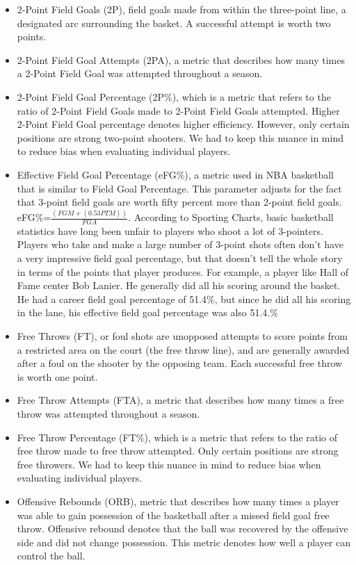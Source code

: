 \documentclass{acm_proc_article-sp}
\begin{document}
\begin{itemize}
\item 2-Point Field Goals (2P), field goals made from within the three-point line, a designated arc surrounding the basket. A successful attempt is worth two points.
\item 2-Point Field Goal Attempts (2PA), a metric that describes how many times a 2-Point Field Goal was attempted throughout a season. 
\item 2-Point Field Goal Percentage (2P\%), which is a metric that refers to the ratio of 2-Point Field Goals made to 2-Point Field Goals attempted. Higher 2-Point Field Goal percentage denotes higher efficiency. However, only certain positions are strong two-point shooters.  We had to keep this nuance in mind to reduce bias when evaluating individual players.
\item Effective Field Goal Percentage (eFG\%), a metric used in NBA basketball that is similar to Field Goal Percentage.  This parameter adjusts for the fact that 3-point field goals are worth fifty percent more than 2-point field goals. eFG\%=$\frac{(FGM+(0.53PTM))}{FGA}$. According to Sporting Charts, basic basketball statistics have long been unfair to players who shoot a lot of 3-pointers. Players who take and make a large number of 3-point shots often don't have a very impressive field goal percentage, but that doesn't tell the whole story in terms of the points that player produces. For example, a player like Hall of Fame center Bob Lanier. He generally did all his scoring around the basket. He had a career field goal percentage of 51.4\%, but since he did all his scoring in the lane, his effective field goal percentage was also 51.4.\%    ~\cite{C}
\item Free Throws (FT), or foul shots are unopposed attempts to score points from a restricted area on the court (the free throw line), and are generally awarded after a foul on the shooter by the opposing team. Each successful free throw is worth one point. 
\item Free Throw Attempts (FTA), a metric that describes how many times a free throw was attempted throughout a season. 
\item Free Throw Percentage (FT\%), which is a metric that refers to the ratio of free throw made to free throw attempted. Only certain positions are strong free throwers.  We had to keep this nuance in mind to reduce bias when evaluating individual players.
\item Offensive Rebounds (ORB), metric that describes how many times a player was able to gain possession of the basketball after a missed field goal free throw. Offensive rebound denotes that the ball was recovered by the offensive side and did not change possession. This metric denotes how well a player can control the ball.

\end{itemize}
\end{document}
